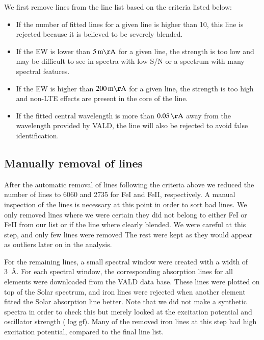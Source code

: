 \documentclass{aa}
\begin{document}
We first remove lines from the line list based on the criteria listed
below:
\begin{itemize}
    \item If the number of fitted lines for a given line is higher than 10,
        this line is rejected because it is believed to be severely blended.
    \item If the EW is lower than $\SI{5}{m\AA}$ for a given line, the strength
        is too low and may be difficult to see in spectra with low S/N or a
        spectrum with many spectral features.
    \item If the EW is higher than $\SI{200}{m\AA}$ for a given line, the strength
        is too high and non-LTE effects are present in the core of the line.
    \item If the fitted central wavelength is more than $\SI{0.05}{\AA}$ away
        from the wavelength provided by VALD, the line will also be rejected to
        avoid false identification.
\end{itemize}




\subsection{Manually removal of lines}
\label{sub:manual_removal_of_lines}
After the automatic removal of lines following the criteria above
we reduced the number of lines to 6060 and 2735 for FeI and FeII,
respectively. A manual inspection of the lines is necessary at this
point in order to sort bad lines. We only removed lines where we were
certain they did not belong to either FeI or FeII from our list or
if the line where clearly blended. We were careful at this step, and
only few lines were removed The rest were kept as they would appear as
outliers later on in the analysis.

For the remaining lines, a small spectral window were created with a
width of \SI{3}{\angstrom}. For each spectral window, the corresponding
absorption lines for all elements were downloaded from the VALD data
base. These lines were plotted on top of the Solar spectrum, and iron
lines were rejected when another element fitted the Solar absorption
line better. Note that we did not make a synthetic spectra in order to
check this but merely looked at the excitation potential and oscillator
strength ($\log \mathrm{gf}$). Many of the removed iron lines at this
step had high excitation potential, compared to the final line list.
\end{document}
